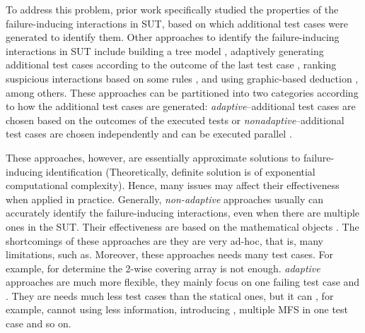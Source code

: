 \documentclass[10pt,journal,cspaper,compsoc]{IEEEtran}
\begin{document}
To address this problem, prior work \cite{nie2011minimal} specifically studied the properties of the failure-inducing interactions in SUT, based on which additional test cases were generated to identify them. Other approaches to identify the failure-inducing interactions in SUT include building a tree model \cite{yilmaz2006covering}, adaptively generating additional test cases according to the outcome of the last test case \cite{zhang2011characterizing}, ranking suspicious interactions based on some rules \cite{ghandehari2012identifying}, and using graphic-based deduction \cite{martinez2008algorithms}, among others. These approaches can be partitioned into two categories \cite{colbourn2008locating} according to how the additional test cases are generated: \emph{adaptive}--additional test cases are chosen based on the outcomes of the executed tests \cite{nie2011minimal,ghandehari2012identifying,niu2013identifying,zhang2011characterizing,shakya2012isolating,wang2010adaptive,li2012improved}or \emph{nonadaptive}--additional test cases are chosen independently and can be executed parallel \cite{yilmaz2006covering,colbourn2008locating,martinez2008algorithms,martinez2009locating}.

These approaches, however, are essentially approximate solutions to failure-inducing identification (Theoretically, definite solution is of exponential computational complexity). Hence, many issues may affect their effectiveness when applied in practice.  Generally, \emph{non-adaptive} approaches usually can accurately identify the failure-inducing interactions, even when there are multiple ones in the SUT. Their effectiveness are based on the mathematical objects \cite{colbourn2008locating,martinez2008algorithms,martinez2009locating}. The shortcomings of these approaches are they are very ad-hoc, that is, many limitations, such as. Moreover, these approaches needs many test cases. For example, for determine the 2-wise covering array is not enough.  \emph{adaptive} approaches are much more flexible, they mainly focus on one failing test case and . They are needs much less test cases than the statical ones, but it can , for example, cannot using less information, introducing , multiple MFS in one test case and so on.
\end{document}
